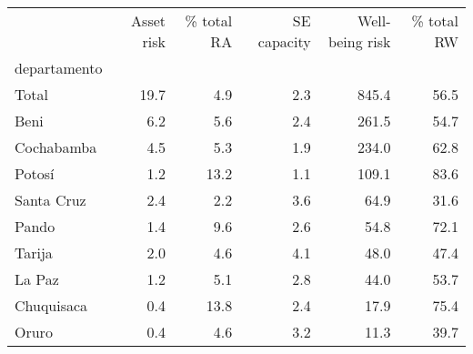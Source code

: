 \begin{tabular}{lrrrrr}
\toprule
{} &  Asset risk &  \% total RA &  SE capacity &  Well-being risk &  \% total RW \\
departamento &             &             &              &                  &             \\
\midrule
Total        &        19.7 &         4.9 &          2.3 &            845.4 &        56.5 \\
Beni         &         6.2 &         5.6 &          2.4 &            261.5 &        54.7 \\
Cochabamba   &         4.5 &         5.3 &          1.9 &            234.0 &        62.8 \\
Potosí       &         1.2 &        13.2 &          1.1 &            109.1 &        83.6 \\
Santa Cruz   &         2.4 &         2.2 &          3.6 &             64.9 &        31.6 \\
Pando        &         1.4 &         9.6 &          2.6 &             54.8 &        72.1 \\
Tarija       &         2.0 &         4.6 &          4.1 &             48.0 &        47.4 \\
La Paz       &         1.2 &         5.1 &          2.8 &             44.0 &        53.7 \\
Chuquisaca   &         0.4 &        13.8 &          2.4 &             17.9 &        75.4 \\
Oruro        &         0.4 &         4.6 &          3.2 &             11.3 &        39.7 \\
\bottomrule
\end{tabular}

